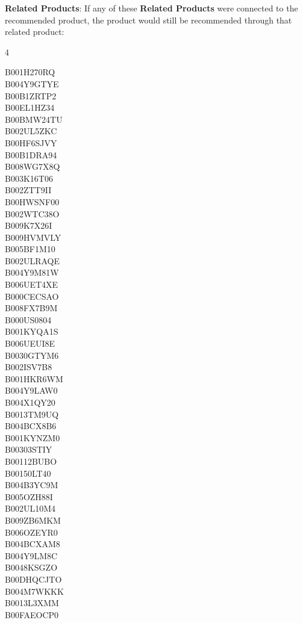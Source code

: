 \textbf{Related Products}: If any of these \textbf{Related Products} were connected to the recommended product,
the product would still be recommended through that related product:
\begin{multicols}{4}
	\raggedright B001H270RQ\\ B004Y9GTYE\\ B00B1ZRTP2\\ B00EL1HZ34\\ B00BMW24TU\\
	B002UL5ZKC\\ B00HF6SJVY\\ B00B1DRA94\\ B008WG7X8Q\\ B003K16T06\\ B002ZTT9II\\
	B00HWSNF00\\ B002WTC38O\\ B009K7X26I\\ B009HVMVLY\\ B005BF1M10\\ B002ULRAQE\\
	B004Y9M81W\\ B006UET4XE\\ B000CECSAO\\ B008FX7B9M\\ B000US0804\\ B001KYQA1S\\
	B006UEUI8E\\ B0030GTYM6\\ B002ISV7B8\\ B001HKR6WM\\ B004Y9LAW0\\ B004X1QY20\\
	B0013TM9UQ\\ B004BCX8B6\\ B001KYNZM0\\ B00303STIY\\ B00112BUBO\\ B00150LT40\\
	B004B3YC9M\\ B005OZH88I\\ B002UL10M4\\ B009ZB6MKM\\ B006OZEYR0\\ B004BCXAM8\\
	B004Y9LM8C\\ B0048KSGZO\\ B00DHQCJTO\\ B004M7WKKK\\ B0013L3XMM\\ B00FAEOCP0\\

\end{multicols}
